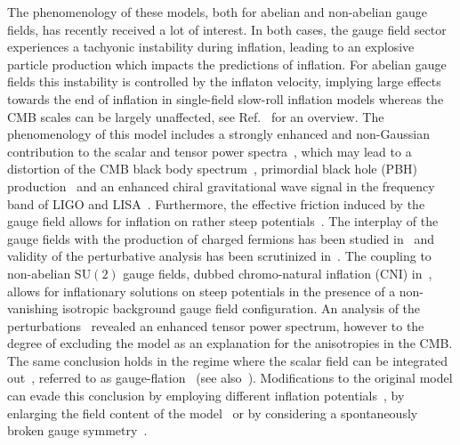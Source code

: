 The phenomenology of these models, both for abelian and non-abelian gauge fields, has recently received a lot of interest. In both cases, the gauge field sector experiences a tachyonic instability during inflation, leading to an explosive particle production which impacts the predictions of inflation. 
For abelian gauge fields this instability is controlled by the inflaton velocity, implying large effects towards the end of inflation in single-field slow-roll inflation models whereas the CMB scales can be largely unaffected, see Ref.~\cite{Barnaby:2010vf} for an overview. The phenomenology of this model includes a strongly enhanced and non-Gaussian contribution to the scalar and tensor power spectra~\cite{Barnaby:2010vf,Barnaby:2011qe,Barnaby:2011vw,Shiraishi:2013kxa,Cook:2013xea}, which may lead to a distortion of the CMB black body spectrum~\cite{Meerburg:2012id}, primordial black hole (PBH) production~\cite{Linde:2012bt, Domcke:2017fix,Garcia-Bellido:2016dkw} and an enhanced chiral gravitational wave signal in the frequency band of LIGO and LISA~\cite{Cook:2011hg,Barnaby:2011qe,Barnaby:2011vw,Anber:2012du,Domcke:2016bkh,Bartolo:2016ami}. Furthermore, the effective friction induced by the gauge field allows for inflation on rather steep potentials~\cite{Anber:2009ua}. The interplay of the gauge fields with the production of charged fermions has been studied in~\cite{Domcke:2018eki} and validity of the perturbative analysis has been scrutinized in~\cite{Ferreira:2015omg, Peloso:2016gqs}. 
The coupling to non-abelian $\mathrm{SU}(2)$ gauge fields, dubbed chromo-natural inflation (CNI) in~\cite{Adshead:2012kp}, allows for inflationary solutions on steep potentials in the presence of a non-vanishing isotropic background gauge field configuration. An analysis of the perturbations~\cite{Dimastrogiovanni:2012st,Dimastrogiovanni:2012ew,Adshead:2013qp,Adshead:2013nka} revealed an enhanced tensor power spectrum, however to the degree of excluding the model as an explanation for the anisotropies in the CMB. The same conclusion holds in the regime where the scalar field can be integrated out~\cite{Namba:2013kia}, referred to as  gauge-flation~\cite{Maleknejad:2011jw,Maleknejad:2011sq} (see also~\cite{Adshead:2012qe,SheikhJabbari:2012qf}). 
Modifications to the original model can evade this conclusion by employing different inflation potentials~\cite{Caldwell:2017chz,DallAgata:2018ybl}, by enlarging the field content of the model~\cite{Dimastrogiovanni:2016fuu,McDonough:2018xzh} or by considering a spontaneously broken gauge symmetry~\cite{Adshead:2016omu}. 


